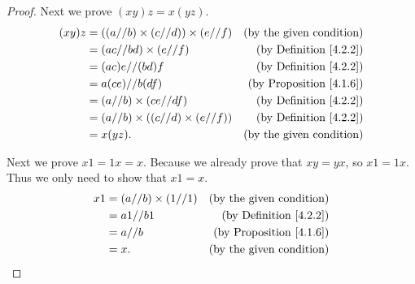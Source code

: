 \begin{proof}
    Next we prove \((xy)z = x(yz)\).
    \begin{align*}
        (xy)z & = ((a // b) \times (c // d)) \times (e // f) & \text{(by the given condition)}     \\
              & = (ac // bd) \times (e // f)                 & \text{(by Definition \ref{4.2.2})}  \\
              & = (ac)e // (bd)f                             & \text{(by Definition \ref{4.2.2})}  \\
              & = a(ce) // b(df)                             & \text{(by Proposition \ref{4.1.6})} \\
              & = (a // b) \times (ce // df)                 & \text{(by Definition \ref{4.2.2})}  \\
              & = (a // b) \times ((c // d) \times (e // f)) & \text{(by Definition \ref{4.2.2})}  \\
              & = x(yz).                                     & \text{(by the given condition)}
    \end{align*}

    Next we prove \(x1 = 1x = x\).
    Because we already prove that \(xy = yx\), so \(x1 = 1x\).
    Thus we only need to show that \(x1 = x\).
    \begin{align*}
        x1 & = (a // b) \times (1 // 1) & \text{(by the given condition)}     \\
           & = a1 // b1                 & \text{(by Definition \ref{4.2.2})}  \\
           & = a // b                   & \text{(by Proposition \ref{4.1.6})} \\
           & = x.                       & \text{(by the given condition)}
    \end{align*}


\end{proof}
